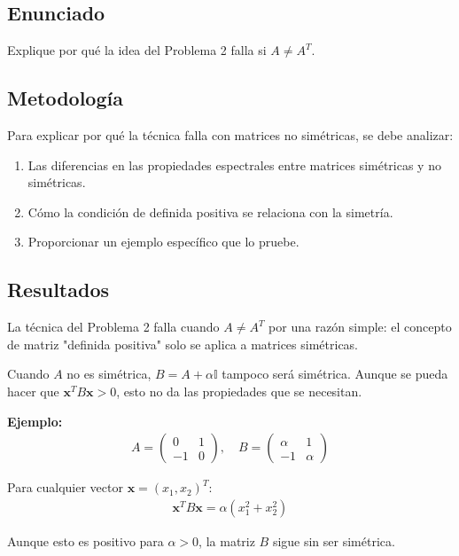\documentclass{article}
\begin{document}
\subsection{Enunciado}
Explique por qué la idea del Problema 2 falla si $A \neq A^T$.

\subsection{Metodología}

Para explicar por qué la técnica falla con matrices no simétricas, se debe analizar:
\begin{enumerate}
    \item Las diferencias en las propiedades espectrales entre matrices simétricas y no simétricas.
    \item Cómo la condición de definida positiva se relaciona con la simetría.
    \item Proporcionar un ejemplo específico que lo pruebe.
\end{enumerate}

\subsection{Resultados}
\setcounter{equation}{0}

La técnica del Problema 2 falla cuando $A \neq A^T$ por una razón simple: el concepto de matriz "definida positiva" solo se aplica a matrices simétricas.

Cuando $A$ no es simétrica, $B = A + \alpha \mathbb{I}$ tampoco será simétrica. Aunque se pueda hacer que $\mathbf{x}^T B \mathbf{x} > 0$, esto no da las propiedades que se necesitan.

\textbf{Ejemplo:}
\begin{align}
A = \begin{pmatrix}
0 & 1 \\
-1 & 0
\end{pmatrix}, \quad B = \begin{pmatrix}
\alpha & 1 \\
-1 & \alpha
\end{pmatrix}
\end{align}

Para cualquier vector $\mathbf{x} = (x_1, x_2)^T$:
\begin{align}
\mathbf{x}^T B \mathbf{x} = \alpha(x_1^2 + x_2^2)
\end{align}

Aunque esto es positivo para $\alpha > 0$, la matriz $B$ sigue sin ser simétrica. 
\end{document}
